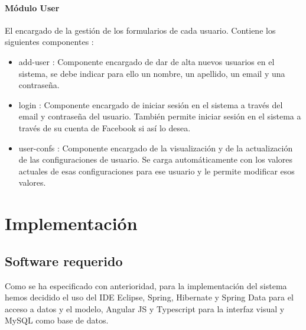 \documentclass[12pt, a4paper, twoside]{book}
\begin{document}
	\subsubsection{Módulo User}
	El encargado de la gestión de los formularios de cada usuario. Contiene los siguientes componentes : 
	\begin{itemize}
		\item add-user : Componente encargado de dar de alta nuevos usuarios en el sistema, se debe indicar para ello un nombre, un apellido, un email y una contraseña.
		\item login : Componente encargado de iniciar sesión en el sistema a través del email y contraseña del usuario. También permite iniciar sesión en el sistema a través de su cuenta de Facebook si así lo desea.
		\item user-confs : Componente encargado de la visualización y de la actualización de las configuraciones de usuario. Se carga automáticamente con los valores actuales de esas configuraciones para ese usuario y le permite modificar esos valores.
	\end{itemize}
	
	\chapter{Implementación}
	\section{Software requerido}
	Como se ha especificado con anterioridad, para la implementación del sistema hemos decidido el uso del IDE Eclipse, Spring, Hibernate y Spring Data para el acceso a datos y el modelo, Angular JS y Typescript para la interfaz visual y MySQL como base de datos.
\end{document}
